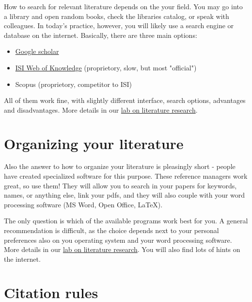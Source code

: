 \documentclass{tufte-book}
\begin{document}
How to search for relevant literature depends on the your field. You may go into a library and open random books, check the libraries catalog, or speak with colleagues. In today's practice, however, you will likely use a search engine or database on the internet. Basically, there are three main options: 

\begin{itemize}
\item \href{https://scholar.google.de/}{Google scholar} 
\item \href{http://webofknowledge.com/}{ISI Web of Knowledge} (proprietory, slow, but most "official")
\item Scopus (proprietory, competitor to ISI)
\end{itemize}

All  of them work fine, with slightly different interface, search options, advantages and disadvantages. More details in our \href{https://github.com/florianhartig/ResearchSkills/tree/master/Labs/LiteratureResearch}{lab on literature research}. 

\section{Organizing your literature}

Also the answer to how to organize your literature is pleasingly short - people have created specialized software for this purpose. These reference managers work great, so use them! They will allow you to search in your papers for keywords, names, or anything else, link your pdfs, and they will also couple with your word processing software (MS Word, Open Office, LaTeX). 


The only question is which of the available programs work best for you. A general recommendation is difficult, as the choice depends next to your personal preferences also on you operating system and your word processing software. More details in our \href{https://github.com/florianhartig/ResearchSkills/tree/master/Labs/LiteratureResearch}{lab on literature research}. You will also find lots of hints on the internet. 

\section{Citation rules}
\end{document}
